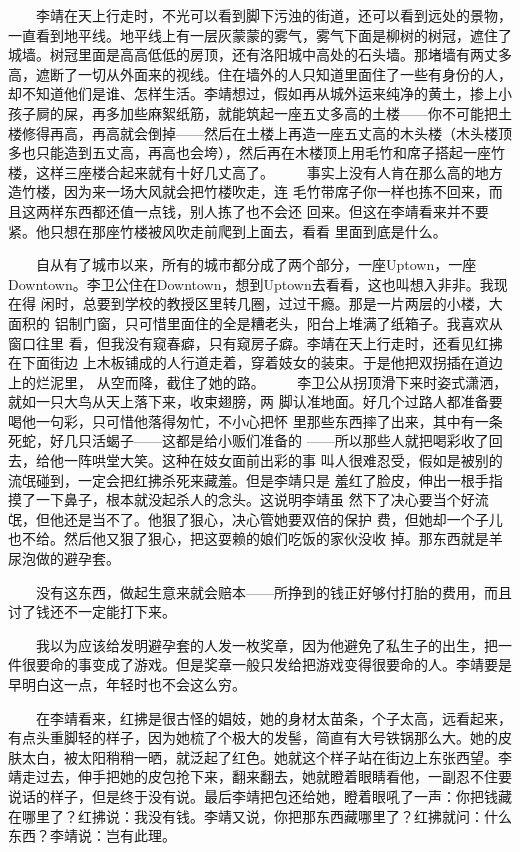  　　李靖在天上行走时，不光可以看到脚下污浊的街道，还可以看到远处的景物， 一直看到地平线。地平线上有一层灰蒙蒙的雾气，雾气下面是柳树的树冠，遮住了 城墙。树冠里面是高高低低的房顶，还有洛阳城中高处的石头墙。那堵墙有两丈多 高，遮断了一切从外面来的视线。住在墙外的人只知道里面住了一些有身份的人， 却不知道他们是谁、怎样生活。李靖想过，假如再从城外运来纯净的黄土，掺上小 孩子屙的屎，再多加些麻絮纸筋，就能筑起一座五丈多高的土楼——你不可能把土 楼修得再高，再高就会倒掉——然后在土楼上再造一座五丈高的木头楼（木头楼顶 多也只能造到五丈高，再高也会垮），然后再在木楼顶上用毛竹和席子搭起一座竹 楼，这样三座楼合起来就有十好几丈高了。 　　事实上没有人肯在那么高的地方造竹楼，因为来一场大风就会把竹楼吹走，连 毛竹带席子你一样也拣不回来，而且这两样东西都还值一点钱，别人拣了也不会还 回来。但这在李靖看来并不要紧。他只想在那座竹楼被风吹走前爬到上面去，看看 里面到底是什么。

 　　自从有了城市以来，所有的城市都分成了两个部分，一座Uptown，一座 Downtown。李卫公住在Downtown，想到Uptown去看看，这也叫想入非非。我现在得 闲时，总要到学校的教授区里转几圈，过过干瘾。那是一片两层的小楼，大面积的 铝制门窗，只可惜里面住的全是糟老头，阳台上堆满了纸箱子。我喜欢从窗口往里 看，但我没有窥春癖，只有窥房子癖。李靖在天上行走时，还看见红拂在下面街边 上木板铺成的人行道走着，穿着妓女的装束。于是他把双拐插在道边上的烂泥里， 从空而降，截住了她的路。 　　李卫公从拐顶滑下来时姿式潇洒，就如一只大鸟从天上落下来，收束翅膀，两 脚认准地面。好几个过路人都准备要喝他一句彩，只可惜他落得匆忙，不小心把怀 里那些东西摔了出来，其中有一条死蛇，好几只活蝎子——这都是给小贩们准备的 ——所以那些人就把喝彩收了回去，给他一阵哄堂大笑。这种在妓女面前出彩的事 叫人很难忍受，假如是被别的流氓碰到，一定会把红拂杀死来藏羞。但是李靖只是 羞红了脸皮，伸出一根手指摸了一下鼻子，根本就没起杀人的念头。这说明李靖虽 然下了决心要当个好流氓，但他还是当不了。他狠了狠心，决心管她要双倍的保护 费，但她却一个子儿也不给。然后他又狠了狠心，把这耍赖的娘们吃饭的家伙没收 掉。那东西就是羊尿泡做的避孕套。

 　　没有这东西，做起生意来就会赔本——所挣到的钱正好够付打胎的费用，而且 讨了钱还不一定能打下来。 

　　我以为应该给发明避孕套的人发一枚奖章，因为他避免了私生子的出生，把一 件很要命的事变成了游戏。但是奖章一般只发给把游戏变得很要命的人。李靖要是 早明白这一点，年轻时也不会这么穷。

 　　在李靖看来，红拂是很古怪的娼妓，她的身材太苗条，个子太高，远看起来， 有点头重脚轻的样子，因为她梳了个极大的发髻，简直有大号铁锅那么大。她的皮 肤太白，被太阳稍稍一晒，就泛起了红色。她就这个样子站在街边上东张西望。李 靖走过去，伸手把她的皮包抢下来，翻来翻去，她就瞪着眼睛看他，一副忍不住要 说话的样子，但是终于没有说。最后李靖把包还给她，瞪着眼吼了一声：你把钱藏 在哪里了？红拂说：我没有钱。李靖又说，你把那东西藏哪里了？红拂就问：什么 东西？李靖说：岂有此理。 

